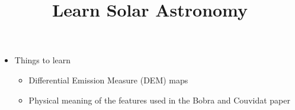 \documentclass{../template/texnote}
\title{Learn Solar Astronomy}
\begin{document}
    \maketitle {}
	\begin{itemize}
		\item Things to learn
			\begin{itemize}
				\item Differential Emission Measure (DEM) maps
				\item Physical meaning of the features used in the Bobra and Couvidat paper
			\end{itemize}
	\end{itemize}
    \printbibliography
\end{document}
